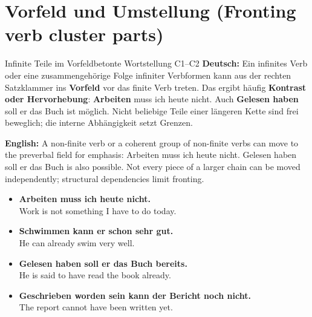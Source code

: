 \documentclass[a4paper,11pt]{article}
\newcommand{\GermanText}[1]{\textbf{Deutsch: }#1\par}
\newcommand{\EnglishText}[1]{{\small\color{SoftGray}\textbf{English: }#1\par}}
\newcommand{\ExampleItem}[2]{\item \textbf{#1}\\{\small\color{SoftGray}#2}}
\newcommand{\DEEN}[2]{\GermanText{#1}\EnglishText{#2}}
\newcommand{\Pair}[2]{\ExampleItem{#1}{#2}}
\begin{document}
\section{Vorfeld und Umstellung \textnormal{(Fronting verb cluster parts)}}
\begin{grammarentry}{Infinite Teile im Vorfeld}{betonte Wortstellung C1--C2}
\DEEN{Ein infinites Verb oder eine zusammengehörige Folge infiniter Verbformen kann aus der rechten Satzklammer ins \textbf{Vorfeld} vor das finite Verb treten. Das ergibt häufig \textbf{Kontrast oder Hervorhebung}: \glqq \textbf{Arbeiten} muss ich heute nicht.\grqq{} Auch \glqq \textbf{Gelesen haben} soll er das Buch\grqq{} ist möglich. Nicht beliebige Teile einer längeren Kette sind frei beweglich; die interne Abhängigkeit setzt Grenzen.}{A non-finite verb or a coherent group of non-finite verbs can move to the preverbal field for emphasis: Arbeiten muss ich heute nicht. Gelesen haben soll er das Buch is also possible. Not every piece of a larger chain can be moved independently; structural dependencies limit fronting.}
\end{grammarentry}
\begin{exbox}\begin{itemize}
\Pair{Arbeiten muss ich heute nicht.}{Work is not something I have to do today.}
\Pair{Schwimmen kann er schon sehr gut.}{He can already swim very well.}
\Pair{Gelesen haben soll er das Buch bereits.}{He is said to have read the book already.}
\Pair{Geschrieben worden sein kann der Bericht noch nicht.}{The report cannot have been written yet.}
\end{itemize}\end{exbox}
\end{document}
